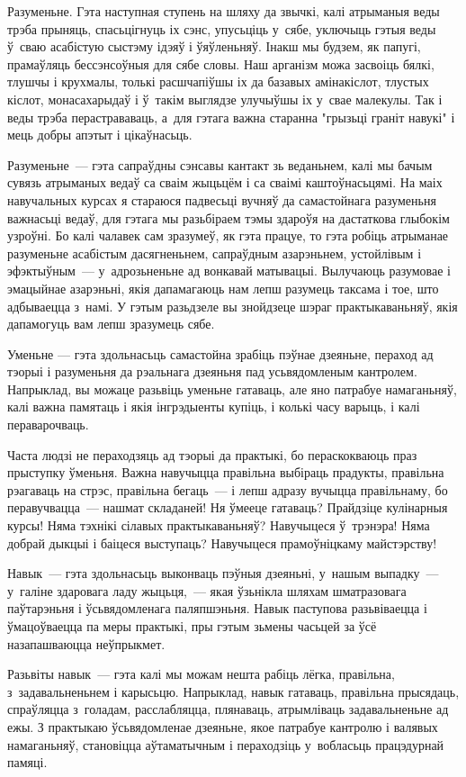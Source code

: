 Разуменьне. Гэта наступная ступень на шляху да звычкі, калі атрыманыя веды трэба прыняць, спасьцігнуць іх сэнс, упусьціць у~сябе, уключыць гэтыя веды ў~сваю асабістую сыстэму ідэяў і ўяўленьняў. Інакш мы будзем, як папугі, прамаўляць бессэнсоўныя для сябе словы. Наш арганізм можа засвоіць бялкі, тлушчы і крухмалы, толькі расшчапіўшы іх да базавых амінакіслот, тлустых кіслот, монасахарыдаў і ў~такім выглядзе улучыўшы іх у~свае малекулы. Так і веды трэба перастрававаць, а~для гэтага важна старанна "грызьці граніт навукі" і мець добры апэтыт і цікаўнасьць.

Разуменьне~--- гэта сапраўдны сэнсавы кантакт зь веданьнем, калі мы бачым сувязь атрыманых ведаў са сваім жыцьцём і са сваімі каштоўнасьцямі. На маіх навучальных курсах я стараюся падвесьці вучняў да самастойнага разуменьня важнасьці ведаў, для гэтага мы разьбіраем тэмы здароўя на дастаткова глыбокім узроўні. Бо калі чалавек сам зразумеў, як гэта працуе, то гэта робіць атрыманае разуменьне асабістым дасягненьнем, сапраўдным азарэньнем, устойлівым і эфэктыўным~--- у~адрозьненьне ад вонкавай матывацыі. Вылучаюць разумовае і эмацыйнае азарэньні, якія дапамагаюць нам лепш разумець таксама і тое, што адбываецца з~намі. У гэтым разьдзеле вы знойдзеце шэраг практыкаваньняў, якія дапамогуць вам лепш зразумець сябе.

Уменьне — гэта здольнасьць самастойна зрабіць пэўнае дзеяньне, пераход ад тэорыі і разуменьня да рэальнага дзеяньня пад усьвядомленым кантролем. Напрыклад, вы можаце разьвіць уменьне гатаваць, але яно патрабуе намаганьняў, калі важна памятаць і якія інгрэдыенты купіць, і колькі часу варыць, і калі пераварочваць.

Часта людзі не пераходзяць ад тэорыі да практыкі, бо пераскокваюць праз прыступку ўменьня. Важна навучыцца правільна выбіраць прадукты, правільна рэагаваць на стрэс, правільна бегаць~--- і лепш адразу вучыцца правільнаму, бо перавучвацца~--- нашмат складаней! Ня ўмееце гатаваць? Прайдзіце кулінарныя курсы! Няма тэхнікі сілавых практыкаваньняў? Навучыцеся ў~трэнэра! Няма добрай дыкцыі і баіцеся выступаць? Навучыцеся прамоўніцкаму майстэрству!

Навык~--- гэта здольнасьць выконваць пэўныя дзеяньні, у~нашым выпадку~--- у~галіне здаровага ладу жыцьця,~--- якая ўзьнікла шляхам шматразовага паўтарэньня і ўсьвядомленага паляпшэньня. Навык паступова разьвіваецца і ўмацоўваецца па меры практыкі, пры гэтым зьмены часьцей за ўсё назапашваюцца неўпрыкмет.

Разьвіты навык~--- гэта калі мы можам нешта рабіць лёгка, правільна, з~задавальненьнем і карысьцю. Напрыклад, навык гатаваць, правільна прысядаць, спраўляцца з~голадам, расслабляцца, плянаваць, атрымліваць задавальненьне ад ежы. З практыкаю ўсьвядомленае дзеяньне, якое патрабуе кантролю і валявых намаганьняў, становіцца аўтаматычным і пераходзіць у~вобласьць працэдурнай памяці.

